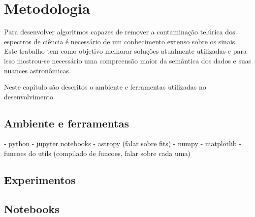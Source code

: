 \chapter{Metodologia}
\label{cap:desenvolvimentos}

Para desenvolver algoritmos capazes de remover a contaminação telúrica dos espectros de ciência é necessário de um conhecimento extenso sobre os sinais. Este trabalho tem como objetivo melhorar soluções atualmente utilizadas e para isso mostrou-se necessário uma compreensão maior da semântica dos dados e suas nuances astronômicas. 

Neste capítulo são descritos o ambiente e ferramentas utilizadas no desenvolvimento 

\section{Ambiente e ferramentas}

- python
- jupyter notebooks
- astropy (falar sobre fits)
- numpy
- matplotlib
- funcoes do utils (compilado de funcoes, falar sobre cada uma)

\section{Experimentos}

\section{Notebooks}



